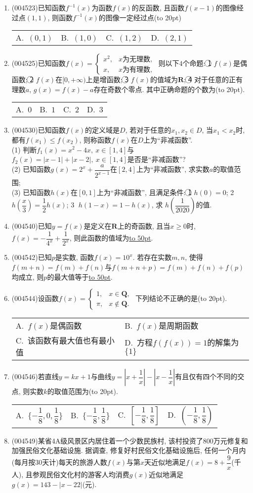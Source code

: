 \documentclass[10pt,a4paper]{article}
\newcommand{\blank}[1]{\underline{\hbox to #1pt{}}}
\newcommand{\bracket}[1]{(\hbox to #1pt{})}
\newcommand{\twoch}[4]{\par\begin{tabular}{p{.46\textwidth}p{.46\textwidth}}
A.~#1& B.~#2\\
C.~#3& D.~#4
\end{tabular}}
\newcommand{\fourch}[4]{\par\begin{tabular}{p{.23\textwidth}p{.23\textwidth}p{.23\textwidth}p{.23\textwidth}}
A.~#1 &B.~#2& C.~#3& D.~#4
\end{tabular}}
\begin{document}
\begin{enumerate}[1.]
\item {\tiny (004523)}已知函数$f^{-1}(x)$为函数$f(x)$的反函数, 且函数$f(x-1)$的图像经过点$(1,1)$, 则函数$f^{-1}(x)$的图像一定经过点\bracket{20}
\fourch{$(0,1)$}{$(1,0)$}{$(1,2)$}{$(2,1)$}
\item {\tiny (004525)}已知函数$f(x)=\begin{cases} x^2, & x\text{为无理数}, \\ x, &x\text{为有理数},   \end{cases}$ 则以下$4$个命题:
\textcircled{1} $f(x)$是偶函数; \textcircled{2} $f(x)$在$[0,+\infty)$上是增函数; \textcircled{3} $f(x)$的值域为$\mathbf{R}$; \textcircled{4} 对于任意的正有理数$a$, $g(x)=f(x)-a$存在奇数个零点.
其中正确命题的个数为\bracket{20}.
\fourch{$0$}{$1$}{$2$}{$3$}
\item {\tiny (004530)}已知函数$f(x)$的定义域是$D$, 若对于任意的$x_1,x_2\in D$, 当$x_1<x_2$时, 都有$f(x_1)\le f(x_2)$, 则称函数$f(x)$在$D$上为``非减函数''.\\
(1) 判断$f_1(x)=x^2-4x, \ x\in [1,4]$与$f_2(x)=|x-1|+|x-2|, \ x\in [1,4]$是否是``非减函数''?\\
(2) 已知函数$g(x)=2^x+\dfrac a{2^{x-1}}$在$[2,4]$上为``非减函数'', 求实数$a$的取值范围;\\
(3) 已知函数$h(x)$在$[0,1]$上为``非减函数'', 且满足条件:
\textcircled{1}  $h(0)=0$; \textcircled{2}  $h(\dfrac x3)=\dfrac 12h(x)$; \textcircled{3}  $h(1-x)=1-h(x)$, 求 $h(\dfrac 1{2020})$的值.
\item {\tiny (004540)}已知$y=f(x)$是定义在$\mathbf{R}$上的奇函数, 且当$x\ge 0$时, $f(x)=-\dfrac 1{4^x}+\dfrac 1{2^x}$, 则此函数的值域为\blank{50}.
\item {\tiny (004542)}已知$p$是实数, 函数$f(x)=10^x$. 若存在实数$m,n$, 使得$f(m+n)=f(m)+f(n)$与$f(m+n+p)=f(m)+f(n)+f(p)$均成立, 则$p$的最大值等于\blank{50}.
\item {\tiny (004544)}设函数$f(x)=\begin{cases}1, & x\in \mathbf{Q}, \\ \pi, &x\not\in \mathbf{Q}.\end{cases}$ 下列结论不正确的是\bracket{20}.
\twoch{$f(x)$是偶函数}{$f(x)$是周期函数}{该函数有最大值也有最小值}{方程$f(f(x))=1$的解集为$\{1\}$}
\item {\tiny (004546)}若直线$y=kx+1$与曲线$y=|x+\dfrac 1x|-|x-\dfrac 1x|$有且仅有四个不同的交点, 则实数$k$的取值范围为\bracket{20}.
\fourch{$\{-\dfrac 18,0,\dfrac 18\}$}{$\{-\dfrac 18,\dfrac 18\}$}{$[-\dfrac 18,\dfrac 18]$}{$(-\dfrac 18,\dfrac 18)$}
\item {\tiny (004549)}某省4A级风景区内居住着一个少数民族村, 该村投资了$800$万元修复和加强民俗文化基础设施. 据调查, 修复好村民俗文化基础设施后, 任何一个月内(每月按$30$天计)每天的旅游人数$f(x)$与第$x$天近似地满足$f(x)=8+\dfrac 9x$(千人), 且参观民俗文化村的游客人均消费$g(x)$近似地满足$g(x)=143-|x-22|$(元).\\

\end{enumerate}
\end{document}

